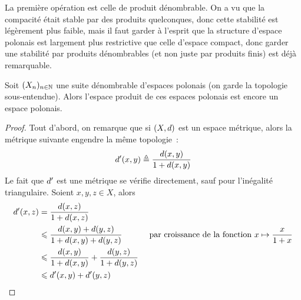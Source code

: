 La première opération est celle de produit dénombrable. On a vu que la compacité
était stable par des produits quelconques, donc cette stabilité est légèrement
plus faible, mais il faut garder à l'esprit que la structure d'espace polonais
est largement plus restrictive que celle d'espace compact, donc garder une
stabilité par produits dénombrables (et non juste par produits finis) est déjà
remarquable.

\begin{proposition}
  Soit $(X_n)_{n\in \mathbb N}$ une suite dénombrable d'espaces polonais (on garde la
  topologie sous-entendue). Alors l'espace produit de ces espaces polonais est
  encore un espace polonais.
\end{proposition}

\begin{proof}
  Tout d'abord, on remarque que si $(X,d)$ est un espace métrique, alors
  la métrique suivante engendre la même topologie~:
  \[d'(x,y) \triangleq \frac{d(x,y)}{1+d(x,y)}\]
  Le fait que $d'$ est une métrique se vérifie directement, sauf pour
  l'inégalité triangulaire. Soient $x,y,z \in X$, alors
  \begin{align*}
    d'(x,z) &= \frac{d(x,z)}{1 + d(x,z)}\\
    &\leqslant \frac{d(x,y) + d(y,z)}{1 + d(x,y) + d(y,z)}
    &\text{ par croissance
      de la fonction } x \mapsto \frac{x}{1 + x}\\
    &\leqslant \frac{d(x,y)}{1 + d(x,y)} +
    \frac{d(y,z)}{1 + d(y,z)}\\
    &\leqslant d'(x,y) + d'(y,z)
  \end{align*}


\end{proof}
